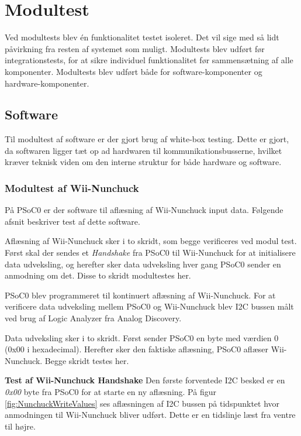 \chapter{Modultest}
\label{afsnit:modulTest}
Ved modultests blev én funktionalitet testet isoleret. Det vil sige med så lidt påvirkning fra resten af systemet som muligt. Modultests blev udført før integrationstests, for at sikre individuel funktionalitet før sammensætning af alle komponenter. Modultests blev udført både for software-komponenter og hardware-komponenter.

\section{Software}
Til modultest af software er der gjort brug af white-box testing. Dette er gjort, da softwaren ligger tæt op ad hardwaren til kommunikationsbusserne, hvilket kræver teknisk viden om den interne struktur for både hardware og software.

\subsection{Modultest af Wii-Nunchuck}
På PSoC0 er der software til aflæsning af Wii-Nunchuck input data. Følgende afsnit beskriver test af dette software.\newline

\noindent Aflæsning af Wii-Nunchuck sker i to skridt, som begge verificeres ved modul test. Først skal der sendes et \textit{Handshake} fra PSoC0 til Wii-Nunchuck for at initialisere data udveksling, og herefter sker data udveksling hver gang PSoC0 sender en anmodning om det. Disse to skridt modultestes her.\newline


\noindent PSoC0 blev programmeret til kontinuert aflæsning af Wii-Nunchuck. For at verificere data udveksling mellem PSoC0 og Wii-Nunchuck blev I2C bussen målt ved brug af Logic Analyzer fra Analog Discovery. \newline

\noindent Data udveksling sker i to skridt. Først sender PSoC0 en byte med værdien 0 (0x00 i hexadecimal). Herefter sker den faktiske aflæsning, PSoC0 aflæser Wii-Nunchuck. Begge skridt testes her.


\noindent\textbf{Test af Wii-Nunchuck Handshake}\newline
\noindent Den første forventede I2C besked er en \textit{0x00} byte fra PSoC0 for at starte en ny aflæsning. På figur \ref{fig:NunchuckWriteValues} ses aflæsningen af I2C bussen på tidspunktet hvor anmodningen til Wii-Nunchuck bliver udført. Dette er en tidslinje læst fra ventre til højre.\newline

